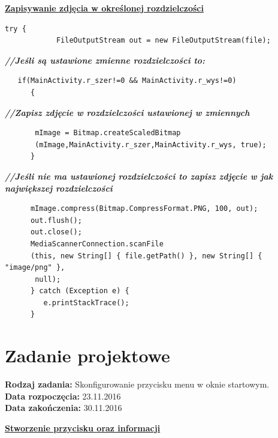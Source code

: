 \begin{center}
\underline{\textbf{Zapisywanie zdjęcia w określonej rozdzielczości}}
\end{center}

\begin{verbatim}
try {
			FileOutputStream out = new FileOutputStream(file);\end{verbatim}
			                                     \textit{\textbf{//Jeśli są ustawione zmienne rozdzielczości to:}}
			                                       \begin{verbatim}
   if(MainActivity.r_szer!=0 && MainActivity.r_wys!=0)
      {\end{verbatim}
                                           \textit{\textbf{//Zapisz zdjęcie w rozdzielczości ustawionej w zmiennych}}
                                             \begin{verbatim}
       mImage = Bitmap.createScaledBitmap
       (mImage,MainActivity.r_szer,MainActivity.r_wys, true);
      }\end{verbatim}
                                           \textit{\textbf{//Jeśli nie ma ustawionej rozdzielczości to zapisz zdjęcie w jak największej rozdzielczości}}
                                             \begin{verbatim}
      mImage.compress(Bitmap.CompressFormat.PNG, 100, out);
      out.flush();
      out.close();
      MediaScannerConnection.scanFile
      (this, new String[] { file.getPath() }, new String[] { "image/png" },
       null);
      } catch (Exception e) {
         e.printStackTrace();
      }
\end{verbatim}

\section{Zadanie projektowe}
\noindent\textbf{Rodzaj zadania:}   Skonfigurowanie przycisku menu w oknie startowym.\\

\noindent\textbf{Data rozpoczęcia:} 23.11.2016\\

\noindent\textbf{Data zakończenia:} 30.11.2016\\

\begin{center}
\underline{\textbf{Stworzenie przycisku oraz informacji}}
\end{center}

